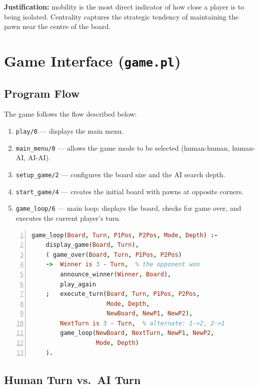 \textbf{Justification:} mobility is the most direct indicator of how close a
player is to being isolated. Centrality captures the strategic tendency of
maintaining the pawn near the centre of the board.

\section{Game Interface (\texttt{game.pl})}
\label{sec:game_loop}

\subsection{Program Flow}

The game follows the flow described below:

\begin{enumerate}
  \item \texttt{play/0} --- displays the main menu.
  \item \texttt{main\_menu/0} --- allows the game mode to be selected
        (human-human, human-AI, AI-AI).
  \item \texttt{setup\_game/2} --- configures the board size and the
        AI search depth.
  \item \texttt{start\_game/4} --- creates the initial board with pawns
        at opposite corners.
  \item \texttt{game\_loop/6} --- main loop: displays the board,
        checks for game over, and executes the current player's turn.
\end{enumerate}

\begin{lstlisting}[language=Prolog,
    caption={Main game loop},
    label={lst:game_loop},
    numbers=left,
    basicstyle=\small\ttfamily,
    frame=single]
game_loop(Board, Turn, P1Pos, P2Pos, Mode, Depth) :-
    display_game(Board, Turn),
    ( game_over(Board, Turn, P1Pos, P2Pos)
    ->  Winner is 3 - Turn,  % the opponent won
        announce_winner(Winner, Board),
        play_again
    ;   execute_turn(Board, Turn, P1Pos, P2Pos,
                     Mode, Depth,
                     NewBoard, NewP1, NewP2),
        NextTurn is 3 - Turn,  % alternate: 1->2, 2->1
        game_loop(NewBoard, NextTurn, NewP1, NewP2,
                  Mode, Depth)
    ).
\end{lstlisting}

\subsection{Human Turn vs.\ AI Turn}

